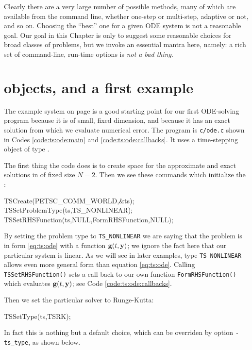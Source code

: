 Clearly there are a very large number of possible methods, many of which are available from the \PETSc command line, whether one-step or multi-step, adaptive or not, and so on.   Choosing the ``best'' one for a given ODE system is not a reasonable goal.  Our goal in this Chapter is only to suggest some reasonable choices for broad classes of problems, but we invoke an essential \PETSc mantra here, namely: a rich set of command-line, run-time options is \emph{not a bad thing}.

\section{\PETSc \pTS objects, and a first example}  The example system on page \pageref{ex:ts:odeeasy} is a good starting point for our first ODE-solving program because it is of small, fixed dimension, and because it has an exact solution from which we evaluate numerical error.  The program is \texttt{c/\CODELOC ode.c} shown in Codes \ref{code:ts:ode:main} and \ref{code:ts:ode:callbacks}.  It uses a \PETSc time-stepping object of type \pTS.


The first thing the code does is to create space for the approximate and exact solutions in \pVecs of fixed size $N=2$.  Then we see these commands which initialize the \pTS:
\begin{code}
  TSCreate(PETSC_COMM_WORLD,&ts);
  TSSetProblemType(ts,TS_NONLINEAR);
  TSSetRHSFunction(ts,NULL,FormRHSFunction,NULL);
\end{code}
By setting the problem type to \texttt{TS\_NONLINEAR} we are saying that the problem is in form \eqref{eq:ts:ode} with a function $\mathbf{g}(t,\mathbf{y})$; we ignore the fact here that our particular system is linear.  As we will see in later examples, type \texttt{TS\_NONLINEAR} allows even more general form than equation \eqref{eq:ts:ode}.  Calling \texttt{TSSetRHSFunction()} sets a call-back to our own function \texttt{FormRHSFunction()} which evaluates $\mathbf{g}(t,\mathbf{y})$; see Code \ref{code:ts:ode:callbacks}.

Then we set the particular \pTS solver to Runge-Kutta:
\begin{code}
  TSSetType(ts,TSRK);
\end{code}
In fact this is nothing but a default choice, which can be overriden by option \texttt{-ts\_type}, as shown below.

